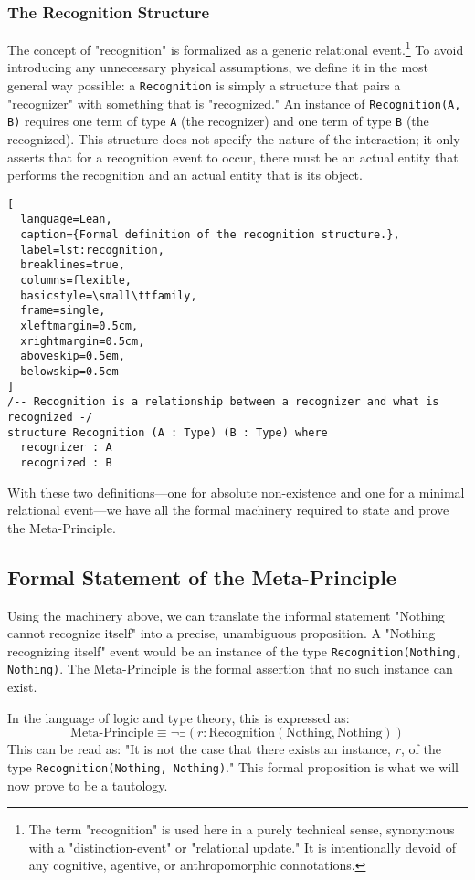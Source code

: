\documentclass[axioms,article,submit,pdftex,oneauthor]{Definitions/mdpi}
\begin{document}
\subsubsection{The Recognition Structure}
The concept of "recognition" is formalized as a generic relational event.\footnote{The term "recognition" is used here in a purely technical sense, synonymous with a "distinction-event" or "relational update." It is intentionally devoid of any cognitive, agentive, or anthropomorphic connotations.} To avoid introducing any unnecessary physical assumptions, we define it in the most general way possible: a \texttt{Recognition} is simply a structure that pairs a "recognizer" with something that is "recognized." An instance of \texttt{Recognition(A, B)} requires one term of type \texttt{A} (the recognizer) and one term of type \texttt{B} (the recognized). This structure does not specify the nature of the interaction; it only asserts that for a recognition event to occur, there must be an actual entity that performs the recognition and an actual entity that is its object.

\begin{lstlisting}[
  language=Lean,
  caption={Formal definition of the recognition structure.},
  label=lst:recognition,
  breaklines=true,
  columns=flexible,
  basicstyle=\small\ttfamily,
  frame=single,
  xleftmargin=0.5cm,
  xrightmargin=0.5cm,
  aboveskip=0.5em,
  belowskip=0.5em
]
/-- Recognition is a relationship between a recognizer and what is recognized -/
structure Recognition (A : Type) (B : Type) where
  recognizer : A
  recognized : B
\end{lstlisting}

With these two definitions—one for absolute non-existence and one for a minimal relational event—we have all the formal machinery required to state and prove the Meta-Principle.

\subsection{Formal Statement of the Meta-Principle}
Using the machinery above, we can translate the informal statement "Nothing cannot recognize itself" into a precise, unambiguous proposition. A "Nothing recognizing itself" event would be an instance of the type \texttt{Recognition(Nothing, Nothing)}. The Meta-Principle is the formal assertion that no such instance can exist.

In the language of logic and type theory, this is expressed as:
\begin{equation}
\text{Meta-Principle} \equiv \neg \exists (r : \text{Recognition}(\text{Nothing}, \text{Nothing}))
\end{equation}
This can be read as: "It is not the case that there exists an instance, $r$, of the type \texttt{Recognition(Nothing, Nothing)}." This formal proposition is what we will now prove to be a tautology.
\end{document}

